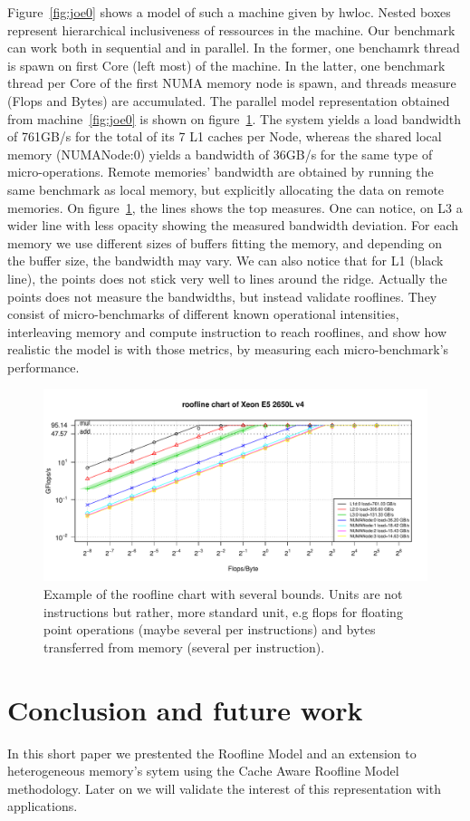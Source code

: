 \documentclass[runningheads,a4paper]{llncs}
\begin{document}
Figure~\ref{fig:joe0} shows a model of such a machine given by hwloc.
Nested boxes represent hierarchical inclusiveness of ressources in the machine.
Our benchmark can work both in sequential and in parallel.
In the former, one benchamrk thread is spawn on first Core (left most) of the machine.
In the latter, one benchmark thread per Core of the first NUMA memory node is spawn, and threads measure (Flops and Bytes) are
accumulated.
The parallel model representation obtained from machine~\ref{fig:joe0} is shown on figure~\ref{fig:orig_model}.
The system yields a load bandwidth of 761GB/s for the total of its 7 L1 caches per Node, whereas the shared local memory
(NUMANode:0) yields a bandwidth of 36GB/s for the same type of micro-operations.
Remote memories' bandwidth are obtained by running the same benchmark as local memory, but explicitly allocating the data on remote
 memories.
On figure~\ref{fig:orig_model}, the lines shows the top measures.
One can notice, on L3 a wider line with less opacity showing the measured bandwidth deviation.
For each memory we use different sizes of buffers fitting the memory, and depending on the buffer size, the bandwidth may vary.
We can also notice that for L1 (black line), the points does not stick very well to lines around the ridge. Actually the points
does not measure the bandwidths, but instead validate rooflines. They consist of micro-benchmarks of different known operational
intensities, interleaving memory and compute instruction to reach rooflines, and show how realistic the model is with those
metrics, by measuring each micro-benchmark's performance.

\begin{figure}
  \centering
  \includegraphics[width=\textwidth]{pictures/roofline_model}
  \caption{Example of the roofline chart with several bounds. Units are not instructions but rather, more standard unit, e.g flops
    for floating point operations (maybe several per instructions) and bytes transferred from memory (several per instruction).}
  \label{fig:orig_model}
\end{figure}

\section{Conclusion and future work}

In this short paper we prestented the Roofline Model and an extension to heterogeneous memory's sytem using the Cache Aware
Roofline Model methodology. Later on we will validate the interest of this representation with applications. 




\end{document}
